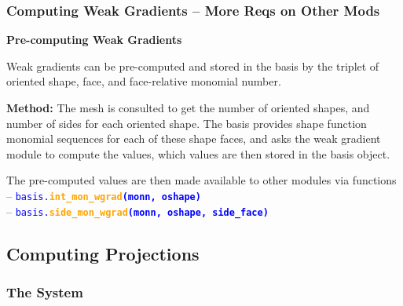 \documentclass[compress]{beamer}
\begin{document}
\begin{frame}
  \frametitle{Computing Weak Gradients -- More Reqs on Other Mods}
 
  \vspace{-.4cm}
  \textbf{Pre-computing Weak Gradients}
  \vspace{.2cm}

  Weak gradients can be pre-computed and stored in the basis by the triplet of oriented shape, face,
    and face-relative monomial number.

  \pause
  \uncover<+-> {
  \vspace{.2cm}
  \textbf{Method:}
    The mesh is consulted to get the number of oriented shapes, and number of sides for each oriented shape. The basis
    provides shape function monomial sequences for each of these shape faces, and asks the weak gradient module to compute the
    values, which values are then stored in the basis object.
 
  \vspace{.15cm}
  \uncover<+-> {
  The pre-computed values are then made available to other modules via functions\\
    -- {\small \texttt{\textcolor{blue}{basis.\textbf{\textcolor{orange}{int\_mon\_wgrad}(monn, oshape)}}}}\\
    -- {\small \texttt{\textcolor{blue}{basis.\textbf{\textcolor{orange}{side\_mon\_wgrad}(monn, oshape, side\_face)}}}}
  }}
\end{frame}
 
\subsection{Computing Projections}

\subsubsection{The System}
\end{document}
